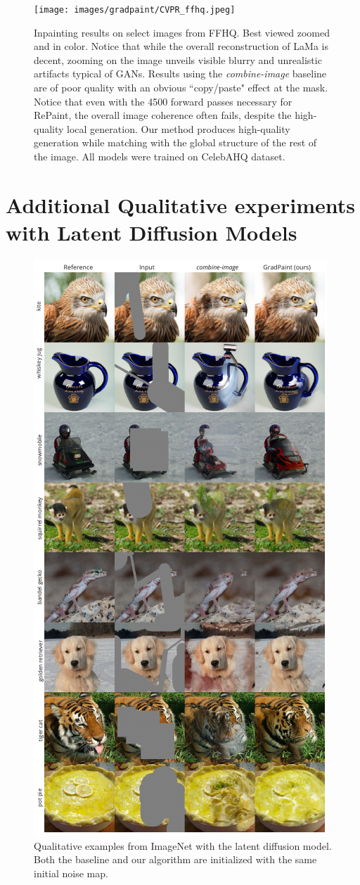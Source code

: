 \begin{figure}[htbp]
  \centering
    \texttt{[image: images/gradpaint/CVPR\_ffhq.jpeg]}
    \caption{Inpainting results on select images from FFHQ. Best viewed zoomed and in color. Notice that while the overall reconstruction of LaMa is decent, zooming on the image unveils visible blurry and unrealistic artifacts typical of GANs. Results using the \emph{combine-image} baseline are of poor quality with an obvious ``copy/paste" effect at the mask. Notice that even with the 4500 forward passes necessary for RePaint, the overall image coherence often fails, despite the high-quality local generation.  Our method produces high-quality generation while matching with the global structure of the rest of the image. All models were trained on CelebAHQ dataset.}
    \label{fig:res_ffhq}
\end{figure}

\section{Additional Qualitative experiments with Latent Diffusion Models}
\begin{figure}
    \centering
    \includegraphics[width=0.625\linewidth]{images/gradpaint/in_latent_samples.pdf}
    \caption{Qualitative examples from ImageNet with the latent diffusion model. Both the baseline and our algorithm are initialized with the same initial noise map.}
    \label{fig:qualitative_latent_imagenet}
\end{figure}

